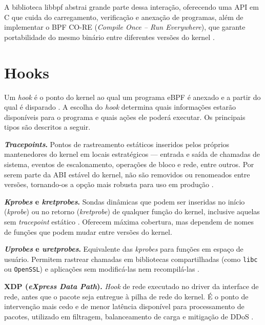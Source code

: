 A biblioteca libbpf \cite{libbpf} abstrai grande parte dessa interação,
oferecendo uma API em C que cuida do carregamento, verificação e anexação de
programas, além de implementar o BPF CO-RE (\textit{Compile Once -- Run
Everywhere}), que garante portabilidade do mesmo binário entre diferentes versões
do kernel \cite{nakryiko2020}.

\section{Hooks}

Um \textit{hook} é o ponto do kernel ao qual um programa eBPF é anexado e a
partir do qual é disparado \cite{linuxkernel2024}.
A escolha do \textit{hook} determina quais informações estarão disponíveis para
o programa e quais ações ele poderá executar.
Os principais tipos são descritos a seguir.

\textbf{\textit{Tracepoints}.}
Pontos de rastreamento estáticos inseridos pelos próprios mantenedores do kernel
em locais estratégicos — entrada e saída de chamadas de sistema, eventos de
escalonamento, operações de bloco e rede, entre outros.
Por serem parte da ABI estável do kernel, não são removidos ou renomeados entre
versões, tornando-os a opção mais robusta para uso em produção \cite{gregg2019}.

\textbf{\textit{Kprobes} e \textit{kretprobes}.}
Sondas dinâmicas que podem ser inseridas no início (\textit{kprobe}) ou no
retorno (\textit{kretprobe}) de qualquer função do kernel, inclusive aquelas
sem \textit{tracepoint} estático \cite{gregg2020}.
Oferecem máxima cobertura, mas dependem de nomes de funções que podem mudar
entre versões do kernel.

\textbf{\textit{Uprobes} e \textit{uretprobes}.}
Equivalente das \textit{kprobes} para funções em espaço de usuário.
Permitem rastrear chamadas em bibliotecas compartilhadas (como \texttt{libc} ou
\texttt{OpenSSL}) e aplicações sem modificá-las nem recompilá-las
\cite{bpftrace}.

\textbf{XDP (\textit{eXpress Data Path}).}
\textit{Hook} de rede executado no driver da interface de rede, antes que o pacote
seja entregue à pilha de rede do kernel.
É o ponto de intervenção mais cedo e de menor latência disponível para
processamento de pacotes, utilizado em filtragem, balanceamento de carga e
mitigação de DDoS \cite{linuxkernel2024}.

